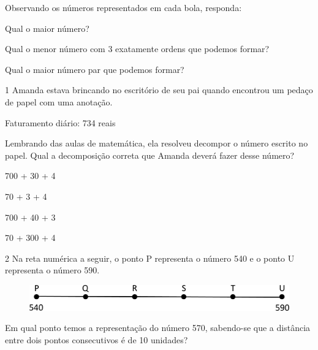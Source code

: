 Observando os números representados em cada bola, responda:

\begin{escolha}
\item Qual o maior número?


\item Qual o menor número com 3 exatamente ordens que podemos formar?


\item Qual o maior número par que podemos formar?


\end{escolha}


\pagebreak
{}

\num{1} Amanda estava brincando no escritório de seu pai quando
encontrou um pedaço de papel com uma anotação.

\begin{myquote}
Faturamento diário: 734 reais
\end{myquote}

Lembrando das aulas de matemática, ela resolveu decompor o número escrito
no papel. Qual a decomposição correta que Amanda deverá fazer desse
número?

\begin{escolha}
\item
  700 + 30 + 4
\item
  70 + 3 + 4
\item
  700 + 40 + 3
\item
  70 + 300 + 4
\end{escolha}

\num{2} Na reta numérica a seguir, o ponto P representa o número 540 e o ponto U representa o número 590.

\begin{figure}[htpb!]
\centering
\includegraphics[width=\textwidth]{./media/image8.png}
\end{figure}

Em qual ponto temos a representação do número 570, sabendo-se que a
distância entre dois pontos consecutivos é de 10 unidades?

